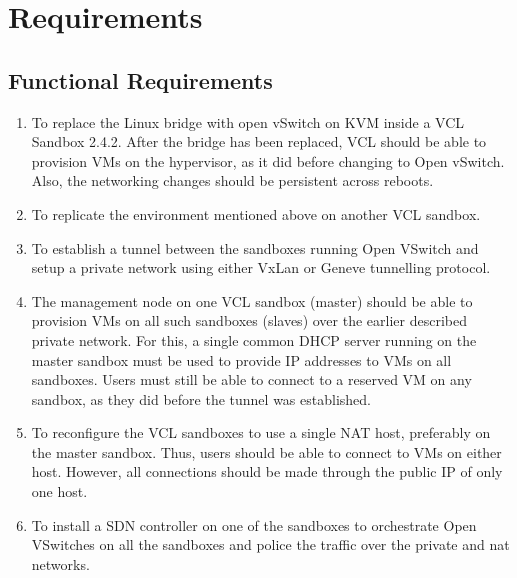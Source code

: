 \documentclass[12pt]{extarticle}
\begin{document}
\section{Requirements}
\subsection{Functional Requirements}
\begin{enumerate}
    \item To replace the Linux bridge with open vSwitch on KVM inside a VCL Sandbox 2.4.2. After the bridge has been replaced, VCL should be able to provision VMs on the hypervisor, as it did before changing to Open vSwitch. Also, the networking changes should be persistent across reboots.

    \item To replicate the environment mentioned above on another VCL sandbox. 
    
    \item To establish a tunnel between the sandboxes running Open VSwitch and setup a private network using either VxLan or Geneve tunnelling protocol.

    \item The management node on one VCL sandbox (master) should be able to provision VMs on all such sandboxes (slaves) over the earlier described private network. For this, a single common DHCP server running on the master sandbox must be used to provide IP addresses to VMs on all sandboxes. Users must still be able to connect to a reserved VM on any sandbox, as they did before the tunnel was established.
    
    \item To reconfigure the VCL sandboxes to use a single NAT host, preferably on the master sandbox. Thus, users should be able to connect to VMs on either host. However, all connections should be made through the public IP of only one host.

    
    
    

        
    \item To install a SDN controller on one of the sandboxes to orchestrate Open VSwitches on all the sandboxes and police the traffic over the private and nat networks.
    
\end{enumerate}
\end{document}
